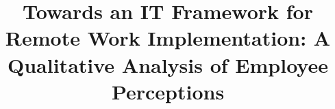 \documentclass[a4paper, conference]{IEEEtran}
\begin{document}
%

\title{\title{Towards an IT Framework for Remote Work Implementation: A Qualitative Analysis of Employee Perceptions}
}
\end{document}
